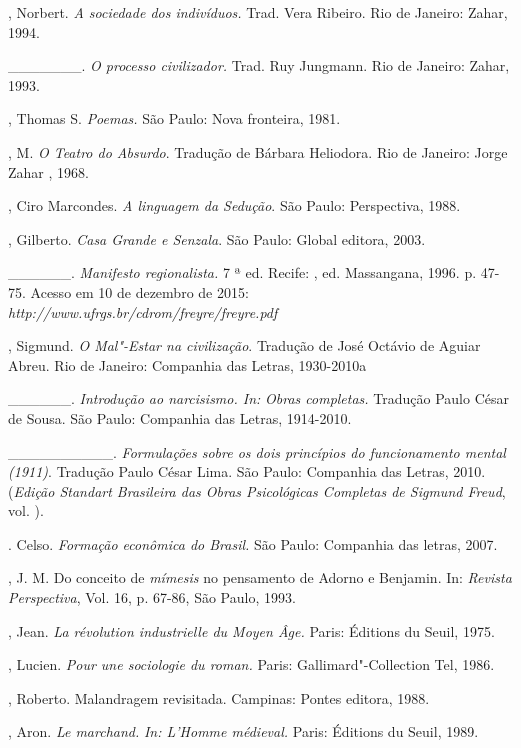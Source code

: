 {\begin{Parskip}
, Norbert. \emph{A sociedade dos indivíduos.} Trad. Vera Ribeiro.
Rio de Janeiro: Zahar, 1994.

\_\_\_\_\_\_\_. \emph{O processo civilizador.} Trad. Ruy Jungmann. Rio
de Janeiro: Zahar, 1993.

, Thomas S. \emph{Poemas.} São Paulo: Nova fronteira, 1981.

, M. \emph{O Teatro do Absurdo}. Tradução de Bárbara
Heliodora. Rio de Janeiro: Jorge Zahar , 1968.

, Ciro Marcondes. \emph{A linguagem da Sedução}. São Paulo:
Perspectiva, 1988.

, Gilberto. \emph{Casa Grande e Senzala}. São Paulo: Global
editora, 2003.

\_\_\_\_\_\_. \emph{Manifesto regionalista.} 7 ª ed. Recife: ,
ed. Massangana, 1996. p. 47-75. Acesso em 10 de dezembro de 2015:
\emph{http://www.ufrgs.br/cdrom/freyre/freyre.pdf}

, Sigmund. \emph{O Mal"-Estar na civilização}. Tradução de
José Octávio de Aguiar Abreu. Rio de Janeiro: Companhia das Letras,
1930-2010a

\_\_\_\_\_\_. \emph{Introdução ao narcisismo. In:} \emph{Obras
completas.} Tradução Paulo César de Sousa. São Paulo: Companhia das
Letras, 1914-2010.

\_\_\_\_\_\_\_\_\_\_. \emph{Formulações sobre os dois princípios do
funcionamento mental (1911)}. Tradução Paulo César Lima. São Paulo:
Companhia das Letras, 2010. (\emph{Edição Standart Brasileira das Obras
Psicológicas Completas de Sigmund Freud}, vol. ).

. Celso. \emph{Formação econômica do Brasil.} São Paulo:
Companhia das letras, 2007.

, J. M. Do conceito de \emph{mímesis} no pensamento de Adorno e
Benjamin. In: \emph{Revista Perspectiva}, Vol. 16, p. 67-86, São
Paulo, 1993.

, Jean. \emph{La révolution industrielle du Moyen Âge.} Paris:
Éditions du Seuil, 1975.

, Lucien. \emph{Pour une sociologie du roman.} Paris:
Gallimard"-Collection Tel, 1986.

, Roberto. Malandragem revisitada. Campinas: Pontes editora, 1988.

, Aron. \emph{Le marchand.} \emph{In: L'Homme médieval.}
Paris: Éditions du Seuil, 1989.


\end{Parskip}}
